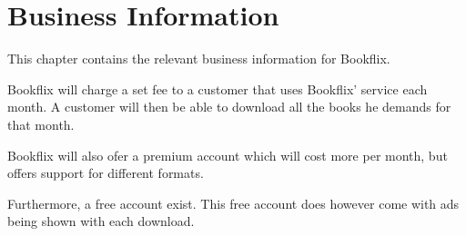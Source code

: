 \chapter*{Business Information}
This chapter contains the relevant business information for Bookflix. 


Bookflix will charge a set fee to a customer that uses Bookflix' service each month. A customer will then be able to download all the books he demands for that month. 


Bookflix will also ofer a premium account which will cost more per month, but offers support for different formats.


Furthermore, a free account exist. This free account does however come with ads being shown with each download.